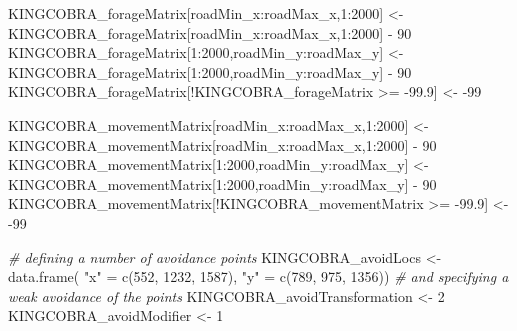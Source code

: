 \documentclass[10pt,a4paper]{article}
\newenvironment{Shaded}{}{}
\newcommand{\CommentTok}[1]{\textit{#1}}
\newcommand{\DecValTok}[1]{#1}
\newcommand{\FloatTok}[1]{#1}
\newcommand{\FunctionTok}[1]{#1}
\newcommand{\NormalTok}[1]{#1}
\newcommand{\OtherTok}[1]{#1}
\newcommand{\SpecialCharTok}[1]{#1}
\newcommand{\StringTok}[1]{#1}
\begin{document}
\begin{Shaded}
\begin{Highlighting}[]
\NormalTok{KINGCOBRA\_forageMatrix[roadMin\_x}\SpecialCharTok{:}\NormalTok{roadMax\_x,}\DecValTok{1}\SpecialCharTok{:}\DecValTok{2000}\NormalTok{] }\OtherTok{\textless{}{-}}
\NormalTok{  KINGCOBRA\_forageMatrix[roadMin\_x}\SpecialCharTok{:}\NormalTok{roadMax\_x,}\DecValTok{1}\SpecialCharTok{:}\DecValTok{2000}\NormalTok{] }\SpecialCharTok{{-}} \DecValTok{90}
\NormalTok{KINGCOBRA\_forageMatrix[}\DecValTok{1}\SpecialCharTok{:}\DecValTok{2000}\NormalTok{,roadMin\_y}\SpecialCharTok{:}\NormalTok{roadMax\_y] }\OtherTok{\textless{}{-}}
\NormalTok{  KINGCOBRA\_forageMatrix[}\DecValTok{1}\SpecialCharTok{:}\DecValTok{2000}\NormalTok{,roadMin\_y}\SpecialCharTok{:}\NormalTok{roadMax\_y] }\SpecialCharTok{{-}} \DecValTok{90}
\NormalTok{KINGCOBRA\_forageMatrix[}\SpecialCharTok{!}\NormalTok{KINGCOBRA\_forageMatrix }\SpecialCharTok{\textgreater{}=} \SpecialCharTok{{-}}\FloatTok{99.9}\NormalTok{] }\OtherTok{\textless{}{-}} \SpecialCharTok{{-}}\DecValTok{99}

\NormalTok{KINGCOBRA\_movementMatrix[roadMin\_x}\SpecialCharTok{:}\NormalTok{roadMax\_x,}\DecValTok{1}\SpecialCharTok{:}\DecValTok{2000}\NormalTok{] }\OtherTok{\textless{}{-}}
\NormalTok{  KINGCOBRA\_movementMatrix[roadMin\_x}\SpecialCharTok{:}\NormalTok{roadMax\_x,}\DecValTok{1}\SpecialCharTok{:}\DecValTok{2000}\NormalTok{] }\SpecialCharTok{{-}} \DecValTok{90}
\NormalTok{KINGCOBRA\_movementMatrix[}\DecValTok{1}\SpecialCharTok{:}\DecValTok{2000}\NormalTok{,roadMin\_y}\SpecialCharTok{:}\NormalTok{roadMax\_y] }\OtherTok{\textless{}{-}}
\NormalTok{  KINGCOBRA\_movementMatrix[}\DecValTok{1}\SpecialCharTok{:}\DecValTok{2000}\NormalTok{,roadMin\_y}\SpecialCharTok{:}\NormalTok{roadMax\_y] }\SpecialCharTok{{-}} \DecValTok{90}
\NormalTok{KINGCOBRA\_movementMatrix[}\SpecialCharTok{!}\NormalTok{KINGCOBRA\_movementMatrix }\SpecialCharTok{\textgreater{}=} \SpecialCharTok{{-}}\FloatTok{99.9}\NormalTok{] }\OtherTok{\textless{}{-}} \SpecialCharTok{{-}}\DecValTok{99}

\CommentTok{\# defining a number of avoidance points}
\NormalTok{KINGCOBRA\_avoidLocs }\OtherTok{\textless{}{-}} \FunctionTok{data.frame}\NormalTok{(}
  \StringTok{"x"} \OtherTok{=} \FunctionTok{c}\NormalTok{(}\DecValTok{552}\NormalTok{, }\DecValTok{1232}\NormalTok{, }\DecValTok{1587}\NormalTok{),}
  \StringTok{"y"} \OtherTok{=} \FunctionTok{c}\NormalTok{(}\DecValTok{789}\NormalTok{, }\DecValTok{975}\NormalTok{, }\DecValTok{1356}\NormalTok{))}
\CommentTok{\# and specifying a weak avoidance of the points }
\NormalTok{KINGCOBRA\_avoidTransformation }\OtherTok{\textless{}{-}} \DecValTok{2}
\NormalTok{KINGCOBRA\_avoidModifier }\OtherTok{\textless{}{-}} \DecValTok{1}


\end{Highlighting}
\end{Shaded}
\end{document}
